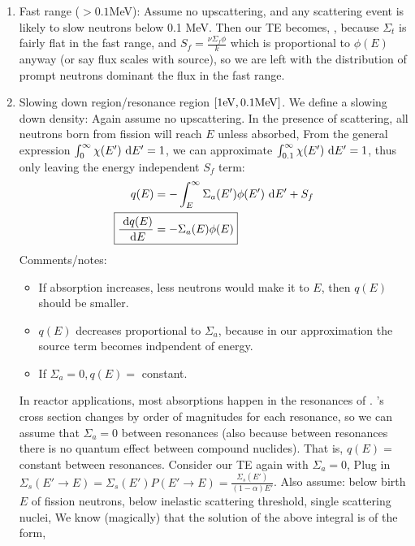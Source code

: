 \documentclass{school-22.211-notes}
\begin{document}
\begin{enumerate}
\item Fast range ($>0.1$MeV): Assume no upscattering, and any scattering event is likely to slow neutrons below 0.1 MeV. Then our TE becomes, 
 , because $\Sigma_t$ is fairly flat in the fast range, and $S_f = \frac{\nu \Sigma_f \phi}{k}$ which is proportional to $\phi(E)$ anyway (or say flux scales with source), so we are left with the distribution of prompt neutrons dominant the flux in the fast range. 

\item Slowing down region/resonance region $[1\mathrm{eV}, 0.1 \mathrm{MeV}]$. We define a slowing down density: 
  Again assume no upscattering. In the presence of scattering, all neutrons born from fission will reach $E$ unless absorbed, 
  From the general expression $\int_0^{\infty} \chi(E') \mbox{ }\mathrm{d} E' = 1$, we can approximate $\int_{0.1}^{\infty} \chi(E') \mbox{ }\mathrm{d} E' = 1$, thus only leaving the energy independent $S_f$ term:  
  \begin{align}
    q(E) &= - \int_E^{\infty} \Sigma_a (E') \phi(E') \dE' + S_f \\
    \Aboxed{ \frac{\derivative q(E)}{\dE} &= - \Sigma_a (E) \phi(E) } 
  \end{align}
  Comments/notes: 
  \begin{itemize}
    \item If absorption increases, less neutrons would make it to $E$, then $q(E)$ should be smaller. 
    \item $q(E)$ decreases proportional to $\Sigma_a$, because in our approximation the source term becomes indpendent of energy. 
    \item If $\Sigma_a = 0, q(E) = $ constant. 
  \end{itemize}

In reactor applications, most absorptions happen in the resonances of . 's cross section changes by order of magnitudes for each resonance, so we can assume that $\Sigma_a = 0$ between resonances (also because between resonances there is no quantum effect between compound nuclides). That is, $q(E)=$ constant between resonances. Consider our TE again with $\Sigma_a = 0$, 
      Plug in $\Sigma_s (E' \to E) = \Sigma_s (E') P(E' \to E) = \frac{\Sigma_s (E')}{(1-\alpha) E'}$. Also assume: below birth $E$ of fission neutrons, below inelastic scattering threshold, single scattering nuclei, 
      We know (magically) that the solution of the above integral is of the form, 


\end{enumerate}
\end{document}
